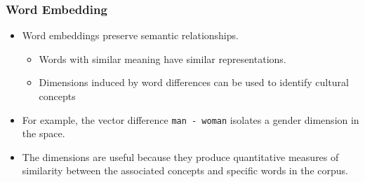 \documentclass[
  shownotes,
  xcolor={svgnames},
  hyperref={colorlinks,citecolor=DarkBlue,linkcolor=DarkRed,urlcolor=DarkBlue}
  , aspectratio=169]{beamer}
\begin{document}
\begin{frame}
\frametitle{Word Embedding }

\begin{itemize}


\item Word embeddings preserve semantic relationships.
  \begin{itemize}
    \item Words with similar meaning have similar representations.
    \medskip
    \item Dimensions induced by word differences can be used to identify cultural concepts 
  \end{itemize}
  \item For example, the vector difference \texttt{man - woman} isolates a gender dimension in the space.
  \medskip
  \item  The dimensions are useful because they produce quantitative measures of similarity between the associated concepts and specific words in the corpus. 
  \end{itemize}


\end{frame}
\end{document}
